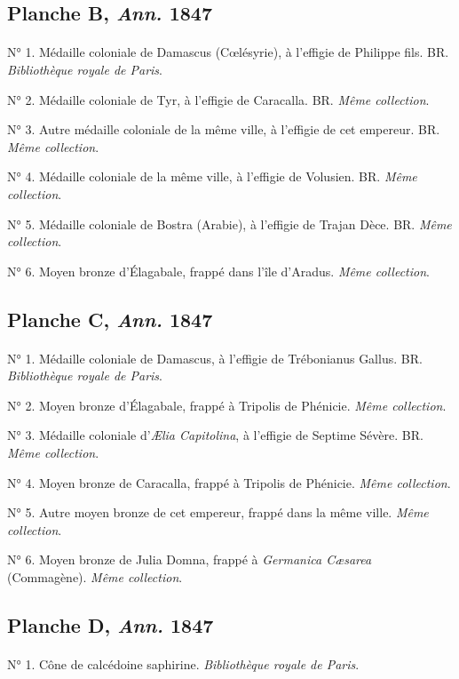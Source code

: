 \documentclass[a4paper, 11pt, oneside, polutonikogreek, french]{article}
\begin{document}
\subsection{Planche B, \emph{Ann.} 1847}
\paragraph{}
N° 1. Médaille coloniale de Damascus (Cœlésyrie), à l'effigie de Philippe fils. BR. \emph{Bibliothèque royale de Paris}.

N° 2. Médaille coloniale de Tyr, à l'effigie de Caracalla. BR. \emph{Même collection}.

N° 3. Autre médaille coloniale de la même ville, à l'effigie de cet empereur. BR. \emph{Même collection}.

N° 4. Médaille coloniale de la même ville, à l'effigie de Volusien. BR. \emph{Même collection}.

N° 5. Médaille coloniale de Bostra (Arabie), à l'effigie de Trajan Dèce. BR. \emph{Même collection}.

N° 6. Moyen bronze d'Élagabale, frappé dans l'île d'Aradus. \emph{Même collection}.
\clearpage
\subsection{Planche C, \emph{Ann.} 1847}
\paragraph{}
N° 1. Médaille coloniale de Damascus, à l'effigie de Trébonianus Gallus. BR. \emph{Bibliothèque royale de Paris}.

N° 2. Moyen bronze d'Élagabale, frappé à Tripolis de Phénicie. \emph{Même collection}.

N° 3. Médaille coloniale d'\emph{Ælia Capitolina}, à l'effigie de Septime Sévère. BR. \emph{Même collection}.

N° 4. Moyen bronze de Caracalla, frappé à Tripolis de Phénicie. \emph{Même collection}.

N° 5. Autre moyen bronze de cet empereur, frappé dans la même ville. \emph{Même collection}.

N° 6. Moyen bronze de Julia Domna, frappé à \emph{Germanica Cæsarea} (Commagène). \emph{Même collection}.
\clearpage
\subsection{Planche D, \emph{Ann.} 1847}
\paragraph{}
N° 1. Cône de calcédoine saphirine. \emph{Bibliothèque royale de Paris}.
\end{document}
